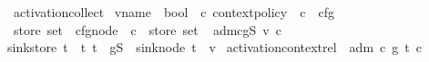 \begin{isabelle}
\ activation\isacharunderscore{}collect\ \isacharcolon{}\isacharcolon{}\isanewline
\isaindent{\ \ }\isachardoublequote{}\isacharparenleft{}vname\ {\isasymRightarrow}\ bool\isacharparenright{}\ {\isasymRightarrow}\ \isacharprime{}c\ context\isacharunderscore{}policy\ {\isasymRightarrow}\ \isacharprime{}c\ {\isasymRightarrow}\ cfg\isanewline
\isaindent{\ \ \ \ \ }{\isasymRightarrow}\ store\ set\ {\isasymRightarrow}\ cfg\isacharunderscore{}node\ {\isasymRightarrow}\ \isacharprime{}c\ {\isasymRightarrow}\ store\ set\isachardoublequote{}\isanewline
\isaindent{\ \ \ \ }\isacharparenleft{}\isachardoublequote{}{\isasymA}\isactrlbsub \isacharunderscore{}\isacharcomma{}\isacharunderscore{}\isacharcomma{}\isacharunderscore{}\isacharcomma{}\isacharunderscore{}\isacharcomma{}\isacharunderscore{}\isactrlesub{}\isachardoublequote{}\isacharparenright{}\ \isanewline
\isaindent{\ \ }\isachardoublequote{}{\isasymA}\isactrlbsub {\isasymG}\isacharcomma{}adm\isacharcomma{}c\isacharcomma{}g\isacharcomma{}S\isactrlesub{}\ v\ c\ \isacharequal{}\isanewline
\isaindent{\ \ \ \ \ }\isacharbraceleft{}sink\isacharunderscore{}store\ t\ \isacharbar{}\ t\isachardot{}\ t\ {\isasymin}\ {\isasymT}\isactrlbsub {\isasymG}\isacharcomma{}g\isacharcomma{}S\isactrlesub{}\ {\isasymand}\ sink\isacharunderscore{}node\ t\ \isacharequal{}\ v\isanewline
\isaindent{\ \ \ \ \ \ \ \ \ \ \ \ \ \ \ \ \ \ \ \ \ \ \ \ }{\isasymand}\ activation\isacharunderscore{}context\isacharunderscore{}rel\ {\isasymG}\ adm\ c\ g\ t\ c\isacharbraceright{}\isachardoublequote{}
\end{isabelle}
